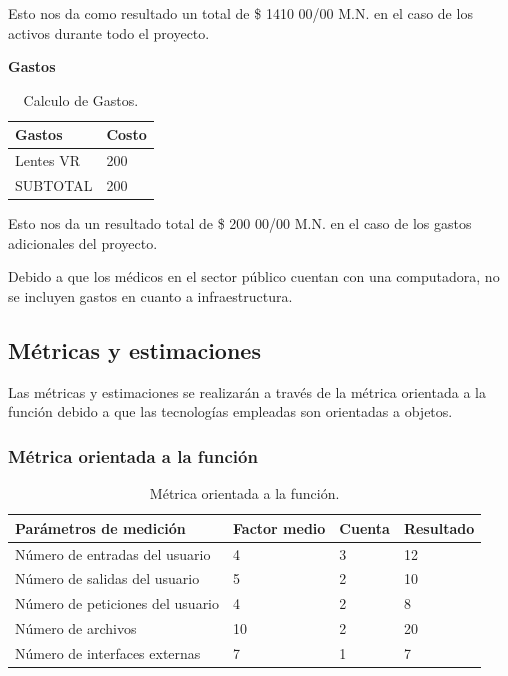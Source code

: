\documentclass[10pt]{article}
\begin{document}
Esto nos da como resultado un total de \$ 1410 00/00 M.N. en el caso de los activos durante todo el proyecto. 

\textbf{Gastos}

\begin{table}[htbp]
\begin{center}
\begin{tabular}{|p{4.2cm}|p{4.2cm}|}
\hline
Gastos & Costo\\
\hline
Lentes VR &  200 \\
\hline
SUBTOTAL & 200\\
\hline
\end{tabular}
\caption{Calculo de Gastos.}
\label{tabla1}
\end{center}
\end{table}

Esto nos da un resultado total de \$ 200 00/00 M.N. en el caso de los gastos adicionales del proyecto. 

Debido a que los médicos en el sector público cuentan con una computadora, no se incluyen gastos en cuanto a infraestructura.

\subsection{Métricas y estimaciones}
Las métricas y estimaciones se realizarán a través de la métrica orientada a la función debido a que las tecnologías empleadas son orientadas a objetos.

\subsubsection{Métrica orientada a la función}
\begin{table}[htbp]
\begin{center}
\begin{tabular}{|p{2.2cm}|p{2.2cm}|p{2.2cm}|p{2.2cm}|}
\hline
Parámetros de medición & Factor medio & Cuenta & Resultado  \\
\hline
Número de entradas del usuario &  4 & 3 & 12\\
\hline
Número de salidas del usuario &  5 & 2 & 10\\
\hline
Número de peticiones del usuario &  4 & 2 & 8\\
\hline
Número de archivos &  10 & 2 & 20\\
\hline
Número de interfaces externas &  7 & 1 & 7\\
\hline
\end{tabular}
\caption{Métrica orientada a la función.}
\label{tabla1}
\end{center}
\end{table}
\end{document}
